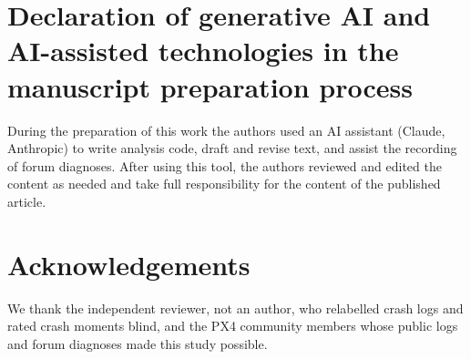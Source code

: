 \documentclass[preprint,12pt]{elsarticle}
\begin{document}
\section*{Declaration of generative AI and AI-assisted technologies in the manuscript preparation process}
During the preparation of this work the authors used an AI assistant (Claude, Anthropic) to write analysis code, draft
and revise text, and assist the recording of forum diagnoses. After using this tool, the authors reviewed and edited
the content as needed and take full responsibility for the content of the published article.

\section*{Acknowledgements}
We thank the independent reviewer, not an author, who relabelled crash logs and rated crash moments blind, and the
PX4 community members whose public logs and forum diagnoses made this study possible.



\end{document}
